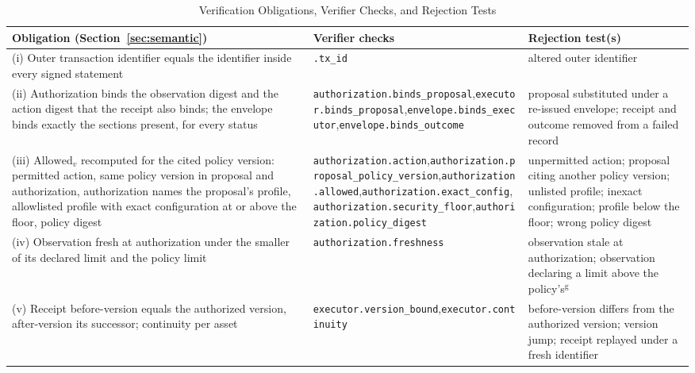 \documentclass[journal]{IEEEtran}
\newcommand{\Allowed}{\mathrm{Allowed}}
\newcommand{\code}[1]{\texttt{\footnotesize #1}}
\begin{document}
\begin{table}[!t]
\caption{Verification Obligations, Verifier Checks, and Rejection Tests}
\label{tab:coverage}
\centering
\footnotesize
\begin{tabular}{>{\raggedright\arraybackslash}p{4.5cm}>{\raggedright\arraybackslash}p{6.4cm}>{\raggedright\arraybackslash}p{5.5cm}}
\toprule
Obligation (Section~\ref{sec:semantic}) & Verifier checks & Rejection test(s) \\
\midrule
(i) Outer transaction identifier equals the identifier inside every signed statement & \code{*.tx\_id} & altered outer identifier \\
(ii) Authorization binds the observation digest and the action digest that the receipt also binds; the envelope binds exactly the sections present, for every status & \code{authorization.binds\_proposal},\newline \code{executor.binds\_proposal},\newline \code{envelope.binds\_executor},\newline \code{envelope.binds\_outcome} & proposal substituted under a re-issued envelope; receipt and outcome removed from a failed record \\
(iii) $\Allowed_v$ recomputed for the cited policy version: permitted action, same policy version in proposal and authorization, authorization names the proposal's profile, allowlisted profile with exact configuration at or above the floor, policy digest & \code{authorization.action},\newline \code{authorization.proposal\_policy\_version},\newline \code{authorization.allowed},\newline \code{authorization.exact\_config},\newline \code{authorization.security\_floor},\newline \code{authorization.policy\_digest} & unpermitted action; proposal citing another policy version; unlisted profile; inexact configuration; profile below the floor; wrong policy digest \\
(iv) Observation fresh at authorization under the smaller of its declared limit and the policy limit & \code{authorization.freshness} & observation stale at authorization; observation declaring a limit above the policy's$^{\mathrm{g}}$ \\
(v) Receipt before-version equals the authorized version, after-version its successor; continuity per asset & \code{executor.version\_bound},\newline \code{executor.continuity} & before-version differs from the authorized version; version jump; receipt replayed under a fresh identifier \\

\end{tabular}
\end{table}
\end{document}
